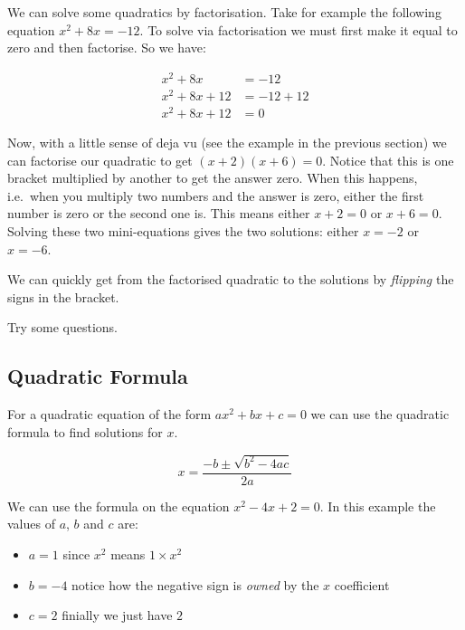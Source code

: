 \documentclass[
  a4paper,
]{scrbook}
\providecommand{\tightlist}{%
  \setlength{\itemsep}{0pt}\setlength{\parskip}{0pt}}
\begin{document}
We can solve some quadratics by factorisation. Take for example the
following equation \(x^2 + 8x = -12\). To solve via factorisation we
must first make it equal to zero and then factorise. So we have:

\[
\begin{aligned} x^2 + 8x &= -12 \\
x^2 + 8x +12 &= -12 +12 \\
x^2 + 8x +12 &= 0
\end{aligned}
\]

Now, with a little sense of deja vu (see the example in the previous
section) we can factorise our quadratic to get \((x+2)(x+6)=0\). Notice
that this is one bracket multiplied by another to get the answer zero.
When this happens, i.e.~when you multiply two numbers and the answer is
zero, either the first number is zero or the second one is. This means
either \(x+2=0\) or \(x+6=0\). Solving these two mini-equations gives
the two solutions: either \(x=-2\) or \(x=-6\).

\begin{tcolorbox}[enhanced jigsaw, arc=.35mm, bottomrule=.15mm, bottomtitle=1mm, breakable, colback=white, colbacktitle=quarto-callout-tip-color!10!white, colframe=quarto-callout-tip-color-frame, coltitle=black, left=2mm, leftrule=.75mm, opacityback=0, opacitybacktitle=0.6, rightrule=.15mm, title=\textcolor{quarto-callout-tip-color}{\faLightbulb}\hspace{0.5em}{Pro tip}, titlerule=0mm, toprule=.15mm, toptitle=1mm]

We can quickly get from the factorised quadratic to the solutions by
\emph{flipping} the signs in the bracket.

\end{tcolorbox}

Try some questions.

\subsection{Quadratic Formula}\label{quadratic-formula}

For a quadratic equation of the form \(ax^2 + bx + c = 0\) we can use
the quadratic formula to find solutions for \(x\).

\[
x = \frac{-b \pm \sqrt{b^2-4ac}}{2a}
\]

We can use the formula on the equation \(x^2 -4x +2 = 0\). In this
example the values of \(a\), \(b\) and \(c\) are:

\begin{itemize}
\tightlist
\item
  \(a=1\) since \(x^2\) means \(1 \times x^2\)
\item
  \(b=-4\) notice how the negative sign is \emph{owned} by the \(x\)
  coefficient
\item
  \(c=2\) finially we just have \(2\)
\end{itemize}
\end{document}
